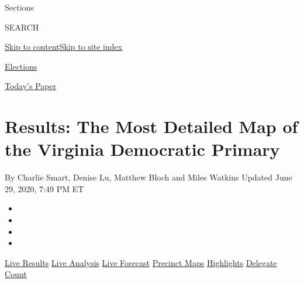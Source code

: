 Sections

SEARCH

\protect\hyperlink{site-content}{Skip to
content}\protect\hyperlink{site-index}{Skip to site index}

\href{https://www.nytimes3xbfgragh.onion/news-event/2020-election}{Elections}

\href{https://myaccount.nytimes3xbfgragh.onion/auth/login?response_type=cookie\&client_id=vi}{}

\href{https://www.nytimes3xbfgragh.onion/section/todayspaper}{Today's
Paper}

\hypertarget{results-the-most-detailed-map-of-the-virginia-democratic-primary}{%
\section{Results: The Most Detailed Map of the Virginia Democratic
Primary}\label{results-the-most-detailed-map-of-the-virginia-democratic-primary}}

By Charlie Smart, Denise Lu, Matthew Bloch and Miles Watkins Updated
June 29, 2020, 7:49 PM ET

\begin{itemize}
\item
\item
\item
\item
\end{itemize}

\href{https://www.nytimes3xbfgragh.onion/interactive/2020/03/03/us/elections/results-super-tuesday-primary-election.html?action=click\&module=ELEX_results\&pgtype=Interactive\&region=Navigation}{Live
Results}
\href{https://www.nytimes3xbfgragh.onion/interactive/2020/03/03/us/elections/live-analysis-super-tuesday.html?action=click\&module=ELEX_results\&pgtype=Interactive\&region=Navigation}{Live
Analysis}
\href{https://www.nytimes3xbfgragh.onion/interactive/2020/03/03/us/elections/forecast-super-tuesday-primary.html?action=click\&module=ELEX_results\&pgtype=Interactive\&region=Navigation}{Live
Forecast}
\href{https://www.nytimes3xbfgragh.onion/interactive/2020/03/03/us/elections/precinct-map-virginia-primary.html?action=click\&module=ELEX_results\&pgtype=Interactive\&region=Navigation}{Precinct
Maps}
\href{https://www.nytimes3xbfgragh.onion/live/2020/primary-results-biden-sanders-03-04?action=click\&module=ELEX_results\&pgtype=Interactive\&region=Navigation}{Highlights}
\href{https://www.nytimes3xbfgragh.onion/interactive/2020/us/elections/delegate-count-primary-results.html?action=click\&module=ELEX_results\&pgtype=Interactive\&region=Navigation}{Delegate
Count}

